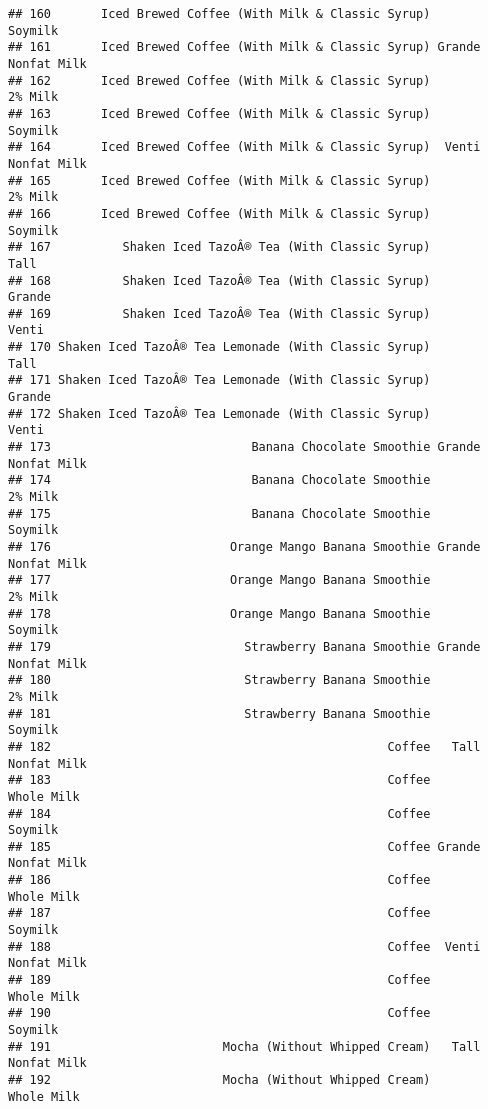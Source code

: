 \documentclass[
]{article}
\begin{document}
\begin{verbatim}
## 160       Iced Brewed Coffee (With Milk & Classic Syrup)            Soymilk
## 161       Iced Brewed Coffee (With Milk & Classic Syrup) Grande Nonfat Milk
## 162       Iced Brewed Coffee (With Milk & Classic Syrup)            2% Milk
## 163       Iced Brewed Coffee (With Milk & Classic Syrup)            Soymilk
## 164       Iced Brewed Coffee (With Milk & Classic Syrup)  Venti Nonfat Milk
## 165       Iced Brewed Coffee (With Milk & Classic Syrup)            2% Milk
## 166       Iced Brewed Coffee (With Milk & Classic Syrup)            Soymilk
## 167          Shaken Iced TazoÂ® Tea (With Classic Syrup)               Tall
## 168          Shaken Iced TazoÂ® Tea (With Classic Syrup)             Grande
## 169          Shaken Iced TazoÂ® Tea (With Classic Syrup)              Venti
## 170 Shaken Iced TazoÂ® Tea Lemonade (With Classic Syrup)               Tall
## 171 Shaken Iced TazoÂ® Tea Lemonade (With Classic Syrup)             Grande
## 172 Shaken Iced TazoÂ® Tea Lemonade (With Classic Syrup)              Venti
## 173                            Banana Chocolate Smoothie Grande Nonfat Milk
## 174                            Banana Chocolate Smoothie            2% Milk
## 175                            Banana Chocolate Smoothie            Soymilk
## 176                         Orange Mango Banana Smoothie Grande Nonfat Milk
## 177                         Orange Mango Banana Smoothie            2% Milk
## 178                         Orange Mango Banana Smoothie            Soymilk
## 179                           Strawberry Banana Smoothie Grande Nonfat Milk
## 180                           Strawberry Banana Smoothie            2% Milk
## 181                           Strawberry Banana Smoothie            Soymilk
## 182                                               Coffee   Tall Nonfat Milk
## 183                                               Coffee         Whole Milk
## 184                                               Coffee            Soymilk
## 185                                               Coffee Grande Nonfat Milk
## 186                                               Coffee         Whole Milk
## 187                                               Coffee            Soymilk
## 188                                               Coffee  Venti Nonfat Milk
## 189                                               Coffee         Whole Milk
## 190                                               Coffee            Soymilk
## 191                        Mocha (Without Whipped Cream)   Tall Nonfat Milk
## 192                        Mocha (Without Whipped Cream)         Whole Milk

\end{verbatim}
\end{document}
